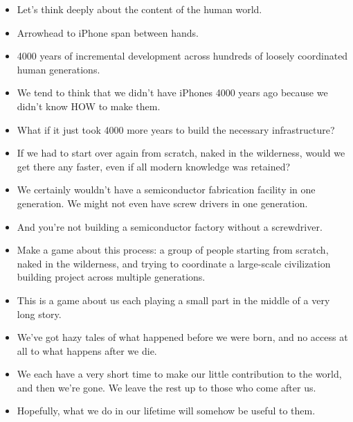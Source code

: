 \documentclass[12pt]{article}
\begin{document}
{\Huge

\begin{itemize}

\item Let's think deeply about the content of the human world.

\item Arrowhead to iPhone span between hands.

\item 4000 years of incremental development across hundreds of loosely coordinated human generations.

\item We tend to think that we didn't have iPhones 4000 years ago because we didn't know HOW to make them.

\item What if it just took 4000 more years to build the necessary infrastructure?

\item If we had to start over again from scratch, naked in the wilderness, would we get there any faster, even if all modern knowledge was retained?

\item We certainly wouldn't have a semiconductor fabrication facility in one generation.  We might not even have screw drivers in one generation.

\item And you're not building a semiconductor factory without a screwdriver.

\item Make a game about this process:  a group of people starting from scratch, naked in the wilderness, and trying to coordinate a large-scale civilization building project across multiple generations.

\item This is a game about us each playing a small part in the middle of a very long story.

\item We've got hazy tales of what happened before we were born, and no access at all to what happens after we die.

\item We each have a very short time to make our little contribution to the world, and then we're gone.  We leave the rest up to those who come after us.

\item Hopefully, what we do in our lifetime will somehow be useful to them.


\end{itemize}}
\end{document}
